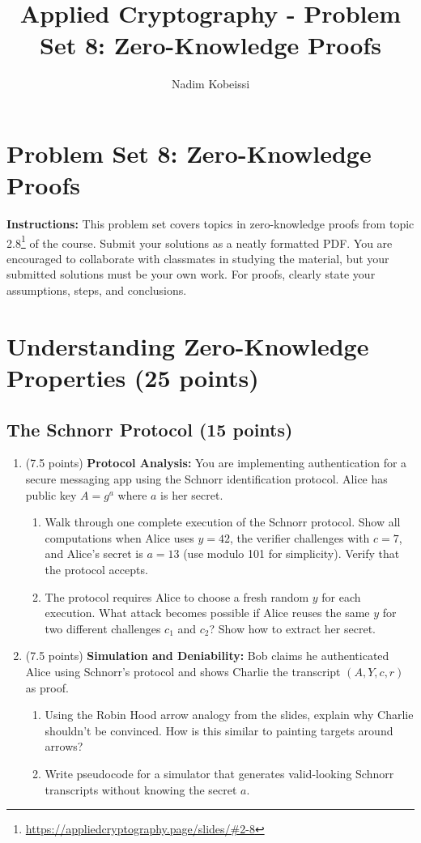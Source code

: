 \documentclass[10pt,a4paper,american]{article}
\title{Applied Cryptography - Problem Set 8: Zero-Knowledge Proofs}
\author{Nadim Kobeissi}
\begin{document}
\classhandoutheader
\section*{Problem Set 8: Zero-Knowledge Proofs}

\begin{tcolorbox}[colframe=OliveGreen!30!white,colback=OliveGreen!5!white]
	\textbf{Instructions:} This problem set covers topics in zero-knowledge proofs from topic 2.8\footnote{\url{https://appliedcryptography.page/slides/\#2-8}} of the course. Submit your solutions as a neatly formatted PDF. You are encouraged to collaborate with classmates in studying the material, but your submitted solutions must be your own work. For proofs, clearly state your assumptions, steps, and conclusions.
\end{tcolorbox}

\section{Understanding Zero-Knowledge Properties (25 points)}

\subsection{The Schnorr Protocol (15 points)}

\begin{enumerate}
	\item (7.5 points) \textbf{Protocol Analysis:}
	      You are implementing authentication for a secure messaging app using the Schnorr identification protocol. Alice has public key $A = g^a$ where $a$ is her secret.
	      \begin{enumerate}
		      \item Walk through one complete execution of the Schnorr protocol. Show all computations when Alice uses $y = 42$, the verifier challenges with $c = 7$, and Alice's secret is $a = 13$ (use modulo 101 for simplicity). Verify that the protocol accepts.
		      \item The protocol requires Alice to choose a fresh random $y$ for each execution. What attack becomes possible if Alice reuses the same $y$ for two different challenges $c_1$ and $c_2$? Show how to extract her secret.
	      \end{enumerate}
	\item (7.5 points) \textbf{Simulation and Deniability:}
	      Bob claims he authenticated Alice using Schnorr's protocol and shows Charlie the transcript $(A, Y, c, r)$ as proof.
	      \begin{enumerate}
		      \item Using the Robin Hood arrow analogy from the slides, explain why Charlie shouldn't be convinced. How is this similar to painting targets around arrows?
		      \item Write pseudocode for a simulator that generates valid-looking Schnorr transcripts without knowing the secret $a$.
	      \end{enumerate}
\end{enumerate}
\end{document}
